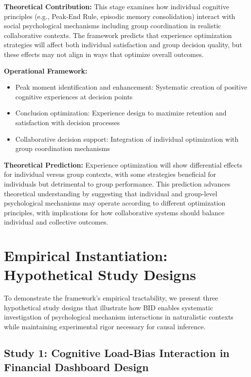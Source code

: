 \documentclass[
  authoryear,
  preprint]{elsarticle}
\providecommand{\tightlist}{%
  \setlength{\itemsep}{0pt}\setlength{\parskip}{0pt}}
\begin{document}
\textbf{Theoretical Contribution:} This stage examines how individual
cognitive principles (e.g., Peak-End Rule, episodic memory
consolidation) interact with social psychological mechanisms including
group coordination in realistic collaborative contexts. The framework
predicts that experience optimization strategies will affect both
individual satisfaction and group decision quality, but these effects
may not align in ways that optimize overall outcomes.

\textbf{Operational Framework:}

\begin{itemize}
\tightlist
\item
  Peak moment identification and enhancement: Systematic creation of
  positive cognitive experiences at decision points
\item
  Conclusion optimization: Experience design to maximize retention and
  satisfaction with decision processes
\item
  Collaborative decision support: Integration of individual optimization
  with group coordination mechanisms
\end{itemize}

\textbf{Theoretical Prediction:} Experience optimization will show
differential effects for individual versus group contexts, with some
strategies beneficial for individuals but detrimental to group
performance. This prediction advances theoretical understanding by
suggesting that individual and group-level psychological mechanisms may
operate according to different optimization principles, with
implications for how collaborative systems should balance individual and
collective outcomes.

\section{Empirical Instantiation: Hypothetical Study
Designs}\label{empirical-instantiation-hypothetical-study-designs}

To demonstrate the framework's empirical tractability, we present three
hypothetical study designs that illustrate how BID enables systematic
investigation of psychological mechanism interactions in naturalistic
contexts while maintaining experimental rigor necessary for causal
inference.

\subsection{Study 1: Cognitive Load-Bias Interaction in Financial
Dashboard
Design}\label{study-1-cognitive-load-bias-interaction-in-financial-dashboard-design}
\end{document}
